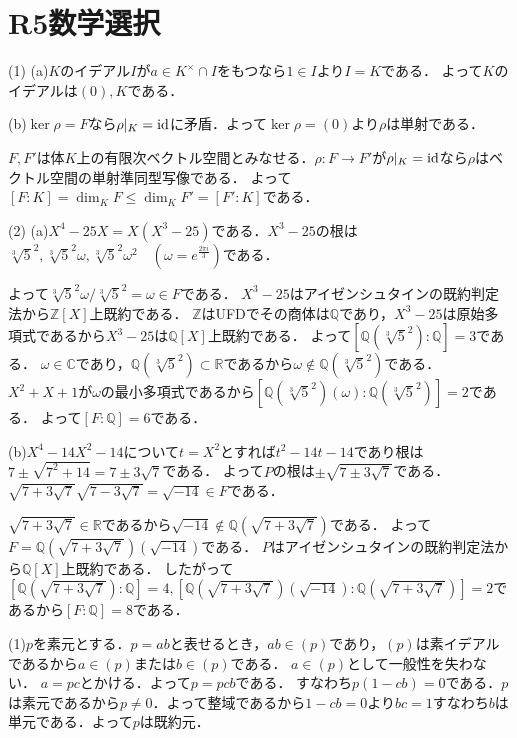 \documentclass[
		book,
		head_space=20mm,
		foot_space=20mm,
		gutter=10mm,
		line_length=190mm
]{jlreq}
\begin{document}
\section{R5数学選択}
(1)
(a)$K$のイデアル$I$が$a\in K^\times \cap I$をもつなら$1\in I$より$I=K$である．
よって$K$のイデアルは$(0),K$である．

(b)$\ker \rho=F$なら$\rho|_K=\mathop{\mathrm{id}}$に矛盾．よって$\ker \rho=(0)$より$\rho$は単射である．

$F,F'$は体$K$上の有限次ベクトル空間とみなせる．$\rho:F\rightarrow F'$が$\rho|_K=\mathop{\mathrm{id}}$なら$\rho$はベクトル空間の単射準同型写像である．
よって$[F:K]=\dim_K F\le \dim_K F'=[F':K]$である．

(2)
(a)$X^4-25X=X(X^3-25)$である．$X^3-25$の根は$\sqrt[3]{5}^2,\sqrt[3]{5}^2\omega,\sqrt[3]{5}^2\omega^2\quad(\omega=e^{\frac{2\pi i}{3}})$である．

よって$\sqrt[3]{5}^2\omega/\sqrt[3]{5}^2=\omega\in F$である．
$X^3-25$はアイゼンシュタインの既約判定法から$\mathbb{Z}[X]$上既約である．
$\mathbb{Z}$はUFDでその商体は$\mathbb{Q}$であり，$X^3-25$は原始多項式であるから$X^3-25$は$\mathbb{Q}[X]$上既約である．
よって$[\mathbb{Q}(\sqrt[3]{5}^2):\mathbb{Q}]=3$である．
$\omega\in \mathbb{C}$であり，$\mathbb{Q}(\sqrt[3]{5}^2)\subset \mathbb{R}$であるから$\omega\notin \mathbb{Q}(\sqrt[3]{5}^2)$である．
$X^2+X+1$が$\omega$の最小多項式であるから$[\mathbb{Q}(\sqrt[3]{5}^2)(\omega):\mathbb{Q}(\sqrt[3]{5}^2)]=2$である．
よって$[F:\mathbb{Q}]=6$である．

(b)$X^4-14X^2-14$について$t=X^2$とすれば$t^2-14t-14$であり根は$7\pm\sqrt{7^2+14}=7\pm3\sqrt{7}$である．
よって$P$の根は$\pm \sqrt{7\pm3\sqrt{7}}$である．
$\sqrt{7+3\sqrt{7}}\sqrt{7-3\sqrt{7}}=\sqrt{-14}\in F$である．

$\sqrt{7+3\sqrt{7}}\in \mathbb{R}$であるから$\sqrt{-14}\notin\mathbb{Q}(\sqrt{7+3\sqrt{7}})$である．
よって$F=\mathbb{Q}(\sqrt{7+3\sqrt{7}})(\sqrt{-14})$である．
$P$はアイゼンシュタインの既約判定法から$\mathbb{Q}[X]$上既約である．
したがって
$[\mathbb{Q}(\sqrt{7+3\sqrt{7}}):\mathbb{Q}]=4,[\mathbb{Q}(\sqrt{7+3\sqrt{7}})(\sqrt{-14}):\mathbb{Q}(\sqrt{7+3\sqrt{7}})]=2$であるから$[F:\mathbb{Q}]=8$である．

(1)$p$を素元とする．$p=ab$と表せるとき，$ab\in (p)$であり，$(p)$は素イデアルであるから$a\in (p)$または$b\in (p)$である．
$a\in (p)$として一般性を失わない．
$a=pc$とかける．よって$p=pcb$である．
すなわち$p(1-cb)=0$である．$p$は素元であるから$p\neq 0$．よって整域であるから$1-cb=0$より$bc=1$すなわち$b$は単元である．よって$p$は既約元．
\end{document}
